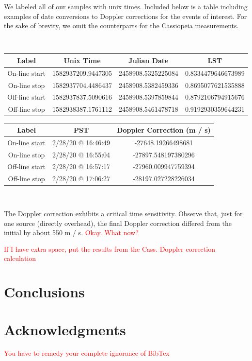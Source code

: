 \documentclass[12pt]{article}
\begin{document}

We labeled all of our samples with unix times. Included below is a table including examples of date conversions to Doppler corrections for the events of interest. For the sake of brevity, we omit the counterparts for the Cassiopeia measurements.

\

\begin{center}
 \begin{tabular}{||c c c c||} 
 \hline
 Label & Unix Time & Julian Date & LST \\ [0.5ex] 
 \hline
 On-line start & 1582937209.9447305 & 2458908.5325225084 & 0.8334479646673989 \\ 
 \hline
 On-line stop & 1582937704.4486437 & 2458908.5382459336 & 0.8695077621535888 \\
 \hline
 Off-line start & 1582937837.5090616 & 2458908.5397859844 & 0.8792106794915676 \\
 \hline
 Off-line stop & 1582938387.1761112 & 2458908.5461478718 & 0.9192930359644231 \\ [1ex] 
 \hline
\end{tabular}
\end{center}

\begin{center}
 \begin{tabular}{||c c c||} 
 \hline
 Label & PST & Doppler Correction (m / s)\\ [0.5ex] 
 \hline
 On-line start & 2/28/20 @ 16:46:49 & -27648.19266498681 \\ 
 \hline
 On-line stop & 2/28/20 @ 16:55:04 & -27897.548197380296 \\
 \hline
 Off-line start & 2/28/20 @ 16:57:17 & -27960.009947759394 \\
 \hline
 Off-line stop & 2/28/20 @ 17:06:27 & -28197.027228226034 \\ [1ex] 
 \hline
\end{tabular}
\end{center}

\

The Doppler correction exhibits a critical time sensitivity. Observe that, just for one source (directly overhead), the final Doppler correction differed from the initial by about 550 m / s. \textcolor{red}{Okay. What now?}

\textcolor{red}{If I have extra space, put the results from the Cass. Doppler correction calculation}

\section{Conclusions}


\section{Acknowledgments}

\textcolor{red}{You have to remedy your complete ignorance of BibTex}
\end{document}
